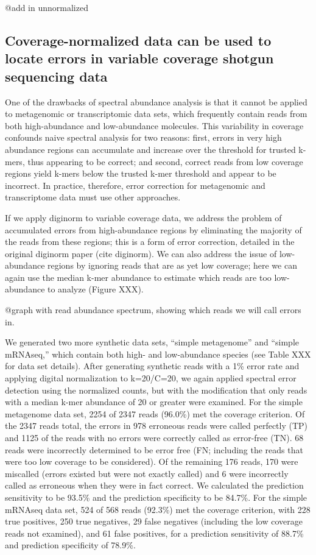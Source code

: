 \documentclass{article}
\begin{document}
@add in unnormalized

\subsection{Coverage-normalized data can be used to locate errors in variable
coverage shotgun sequencing data}

One of the drawbacks of spectral abundance analysis is that it cannot
be applied to metagenomic or transcriptomic data sets, which
frequently contain reads from both high-abundance and low-abundance
molecules.  This variability in coverage confounds naive spectral
analysis for two reasons: first, errors in very high abundance regions
can accumulate and increase over the threshold for trusted k-mers,
thus appearing to be correct; and second, correct reads from low
coverage regions yield k-mers below the trusted k-mer threshold and
appear to be incorrect.  In practice, therefore, error correction for
metagenomic and transcriptome data must use other approaches.

If we apply diginorm to variable coverage data, we address the problem
of accumulated errors from high-abundance regions by eliminating the
majority of the reads from these regions; this is a form of error
correction, detailed in the original diginorm paper (cite diginorm).
We can also address the issue of low-abundance regions by
ignoring reads that are as yet low coverage; here we can again use
the median k-mer abundance to estimate which reads are too
low-abundance to analyze (Figure XXX).

@graph with read abundance spectrum, showing which reads we will
call errors in.


We generated two more synthetic data sets, ``simple metagenome'' and
``simple mRNAseq,'' which contain both high- and low-abundance species
(see Table XXX for data set details).  After generating synthetic
reads with a 1\% error rate and applying digital normalization to
k=20/C=20, we again applied spectral error detection
using the normalized counts, but with the modification that only reads
with a median k-mer abundance of 20 or greater were examined.  For the
simple metagenome data set, 2254 of 2347 reads (96.0\%) met the
coverage criterion.  Of the 2347 reads total, the errors in 978
erroneous reads were called perfectly (TP) and 1125 of the reads with
no errors were correctly called as error-free (TN).  68 reads were
incorrectly determined to be error free (FN; including the reads that
were too low coverage to be considered).  Of the remaining 176 reads,
170 were miscalled (errors existed but were not exactly called) and 6
were incorrectly called as erroneous when they were in fact correct.
We calculated the prediction sensitivity to be 93.5\% and the
prediction specificity to be 84.7\%.  For the simple mRNAseq data set,
524 of 568 reads (92.3\%) met the coverage criterion, with 228 true
positives, 250 true negatives, 29 false negatives (including the low
coverage reads not examined), and 61 false positives, for a prediction
sensitivity of 88.7\% and prediction specificity of 78.9\%.
\end{document}
